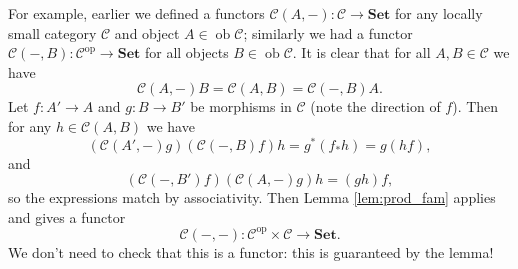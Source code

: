 \documentclass{report}
\newcommand{\mbold}[1]{\mathrm{\mathbf{#1}}}
\DeclareMathOperator{\ob}{ob}
\theoremstyle{definition}
\theoremstyle{plain}
\theoremstyle{definition}
\begin{document}
		For example, earlier we defined a functors $\mathcal{C}(A,-)\colon\mathcal{C}\to \mbold{Set}$ for any locally small category $\mathcal{C}$ and object $A\in\ob\mathcal{C}$; similarly we had a functor $\mathcal{C}(-,B)\colon\mathcal{C}^{\text{op}}\to \mbold{Set}$ for all objects $B\in\ob\mathcal{C}$. It is clear that for all $A,B\in\mathcal{C}$ we have
		\[
			\mathcal{C}(A,-)B = \mathcal{C}(A,B) = \mathcal{C}(-,B)A.
		\]
		Let $f\colon A'\to A$ and $g\colon B\to B'$ be morphisms in $\mathcal{C}$ (note the direction of $f$). Then for any $h\in \mathcal{C}(A,B)$ we have
		\[
			(\mathcal{C}(A',-)g)(\mathcal{C}(-,B)f)h = g^*(f_*h) = g(hf),
		\]
		and
		\[
			(\mathcal{C}(-,B')f)(\mathcal{C}(A,-)g)h = (gh)f,
		\]
		so the expressions match by associativity. Then Lemma \ref{lem:prod_fam} applies and gives a functor
		\[
			\mathcal{C}(-,-) \colon \mathcal{C}^{\text{op}}\times\mathcal{C} \to \mbold{Set}.
		\]
		We don't need to check that this is a functor: this is guaranteed by the lemma!
		
\end{document}
